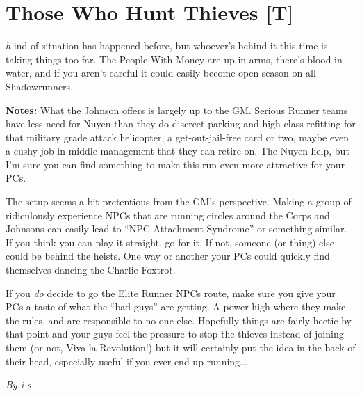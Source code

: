 \documentclass[letterpaper,twocolumn,10.5pt]{article}
\newenvironment{scenario}[6]
	{
		\section{#1 {\small[#2]}}
		\textit{#3}
		\def\TMPSCENARIO{#4 #5}
	}
	{\small\textit{By \TMPSCENARIO}}
\newcommand{\notes}{\textbf{Notes: }}
\begin{document}
\begin{scenario}{Those Who Hunt Thieves}
This kind of situation has happened before, but whoever's behind it this time is taking things too far. The People With Money are up in arms, there's blood in water, and if you aren't careful it could easily become open season on all Shadowrunners.

\notes
What the Johnson offers is largely up to the GM. Serious Runner teams have less need for Nuyen than they do discreet parking and high class refitting for that military grade attack helicopter, a get-out-jail-free card or two, maybe even a cushy job in middle management that they can retire on. The Nuyen help, but I'm sure you can find something to make this run even more attractive for your PCs.

The setup seems a bit pretentious from the GM's perspective. Making a group of ridiculously experience NPCs that are running circles around the Corps and Johnsons can easily lead to ``NPC Attachment Syndrome'' or something similar. If you think you can play it straight, go for it. If not, someone (or thing) else could be behind the heists. One way or another your PCs could quickly find themselves dancing the Charlie Foxtrot.

If you \textit{do} decide to go the Elite Runner NPCs route, make sure you give your PCs a taste of what the ``bad guys'' are getting. A power high where they make the rules, and are responsible to no one else. Hopefully things are fairly hectic by that point and your guys feel the pressure to stop the thieves instead of joining them (or not, Viva la Revolution!) but it will certainly put the idea in the back of their head, especially useful if you ever end up running...


\end{scenario}
\end{document}
